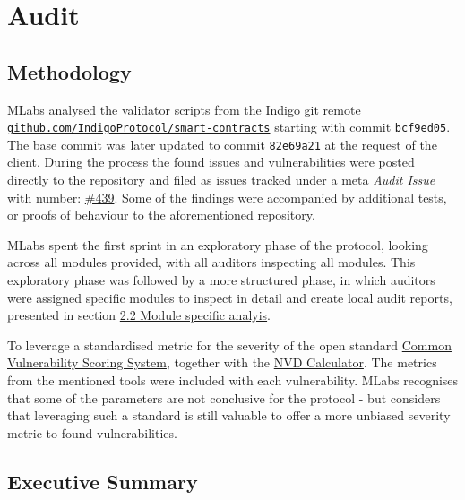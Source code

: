 \chapter{Audit}

\section{Methodology}

MLabs analysed the validator scripts from the Indigo git remote
\href{https://github.com/IndigoProtocol/smart-contracts}{\texttt{github.com/IndigoProtocol/smart-contracts}}
starting with commit \texttt{bcf9ed05}.  The base commit was later updated to
commit \texttt{82e69a21} at the request of the client. During the process the
found issues and vulnerabilities were posted directly to the repository and
filed as issues tracked under a meta \emph{Audit Issue} with number:
\href{https://github.com/IndigoProtocol/smart-contracts/issues/439}{\#439}.
Some of the findings were accompanied by additional tests, or proofs of
behaviour to the aforementioned repository.

MLabs spent the first sprint in an exploratory phase of the protocol,
looking across all modules provided, with all auditors inspecting all
modules. This exploratory phase was followed by a more structured phase,
in which auditors were assigned specific modules to inspect in detail
and create local audit reports, presented in section
\protect\hyperlink{22-module-specific-analyis}{2.2 Module specific
analyis}.

To leverage a standardised metric for the severity of the open standard
\href{https://www.first.org/cvss/}{Common Vulnerability Scoring System},
together with the
\href{https://nvd.nist.gov/vuln-metrics/cvss/v3-calculator}{NVD
Calculator}. The metrics from the mentioned tools were included with
each vulnerability. MLabs recognises that some of the parameters are not
conclusive for the protocol - but considers that leveraging such a
standard is still valuable to offer a more unbiased severity metric to
found vulnerabilities.

\section{Executive Summary}


